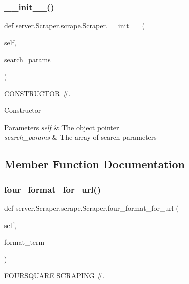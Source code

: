 \subsubsection{\texorpdfstring{\+\_\+\+\_\+init\+\_\+\+\_\+()}{\_\_init\_\_()}}
{\footnotesize\ttfamily def server.\+Scraper.\+scrape.\+Scraper.\+\_\+\+\_\+init\+\_\+\+\_\+ (\begin{DoxyParamCaption}\item[{}]{self,  }\item[{}]{search\+\_\+params }\end{DoxyParamCaption})}



C\+O\+N\+S\+T\+R\+U\+C\+T\+OR \#. 

Constructor 
\begin{DoxyParams}{Parameters}
{\em self} & The object pointer \\
\hline
{\em search\+\_\+params} & The array of search parameters \\
\hline
\end{DoxyParams}


\subsection{Member Function Documentation}
\mbox{\label{classserver_1_1_scraper_1_1scrape_1_1_scraper_ab2dba9f86fe3bbf393833f1c3ddf19d8}} 
\subsubsection{\texorpdfstring{four\+\_\+format\+\_\+for\+\_\+url()}{four\_format\_for\_url()}}
{\footnotesize\ttfamily def server.\+Scraper.\+scrape.\+Scraper.\+four\+\_\+format\+\_\+for\+\_\+url (\begin{DoxyParamCaption}\item[{}]{self,  }\item[{}]{format\+\_\+term }\end{DoxyParamCaption})}



F\+O\+U\+R\+S\+Q\+U\+A\+RE S\+C\+R\+A\+P\+I\+NG \#. 


